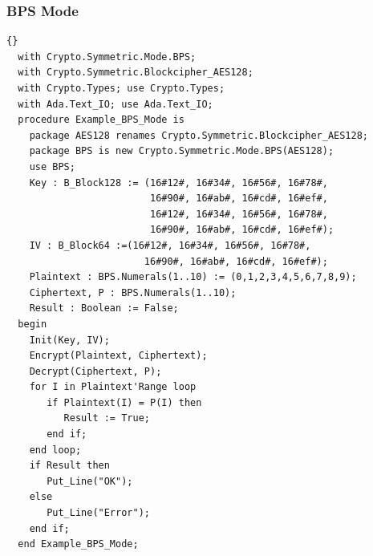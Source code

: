 \subsubsection*{BPS Mode}
\begin{lstlisting}{}
  with Crypto.Symmetric.Mode.BPS;
  with Crypto.Symmetric.Blockcipher_AES128;
  with Crypto.Types; use Crypto.Types;
  with Ada.Text_IO; use Ada.Text_IO;
  procedure Example_BPS_Mode is
    package AES128 renames Crypto.Symmetric.Blockcipher_AES128;
    package BPS is new Crypto.Symmetric.Mode.BPS(AES128);
    use BPS;
    Key : B_Block128 := (16#12#, 16#34#, 16#56#, 16#78#,
	  	                 16#90#, 16#ab#, 16#cd#, 16#ef#,
		                 16#12#, 16#34#, 16#56#, 16#78#,
		                 16#90#, 16#ab#, 16#cd#, 16#ef#);
    IV : B_Block64 :=(16#12#, 16#34#, 16#56#, 16#78#,
		                16#90#, 16#ab#, 16#cd#, 16#ef#);
    Plaintext : BPS.Numerals(1..10) := (0,1,2,3,4,5,6,7,8,9);
    Ciphertext, P : BPS.Numerals(1..10);
    Result : Boolean := False;
  begin
    Init(Key, IV);
    Encrypt(Plaintext, Ciphertext);
    Decrypt(Ciphertext, P);
    for I in Plaintext'Range loop
       if Plaintext(I) = P(I) then
          Result := True;
       end if;
    end loop;
    if Result then
       Put_Line("OK");
    else
       Put_Line("Error");
    end if;
  end Example_BPS_Mode;
\end{lstlisting}
